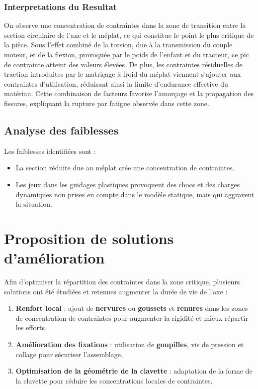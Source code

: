 \documentclass{rapportECL}
\begin{document}
 \subsubsection{Interpretations du Resultat}
 On observe une concentration de contraintes dans la zone de transition entre la section circulaire de l’axe et le méplat, ce qui constitue le point le plus critique de la pièce. Sous l’effet combiné de la torsion, due à la transmission du couple moteur, et de la flexion, provoquée par le poids de l’enfant et du tracteur, ce pic de contrainte atteint des valeurs élevées. De plus, les contraintes résiduelles de traction introduites par le matriçage à froid du méplat viennent s’ajouter aux contraintes d’utilisation, réduisant ainsi la limite d’endurance effective du matériau. Cette combinaison de facteurs favorise l’amorçage et la propagation des fissures, expliquant la rupture par fatigue observée dans cette zone.

\subsection{Analyse des faiblesses}
Les faiblesses identifiées sont :
\begin{itemize}
    \item La section réduite due au méplat crée une concentration de contraintes.
    \item Les jeux dans les guidages plastiques provoquent des chocs et des charges dynamiques non prises en compte dans le modèle statique, mais qui aggravent la situation.
\end{itemize}

\section{Proposition de solutions d'amélioration}

Afin d’optimiser la répartition des contraintes dans la zone critique, plusieurs solutions ont été étudiées et retenues augmenter la durée de vie de l'axe :

\begin{enumerate}
    \item \textbf{Renfort local} : ajout de \textbf{nervures} ou \textbf{goussets} et \textbf{renures} dans les zones de concentration de contraintes pour augmenter la rigidité et mieux répartir les efforts.
    \item \textbf{Amélioration des fixations} : utilisation de \textbf{goupilles}, vis de pression et collage pour sécuriser l’assemblage.
    \item \textbf{Optimisation de la géométrie de la clavette} : adaptation de la forme de la clavette pour réduire les concentrations locales de contraintes.
\end{enumerate}
\end{document}
